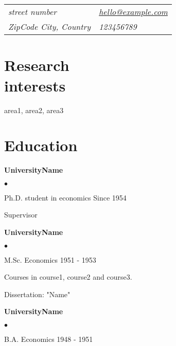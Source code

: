 \documentclass[margin, centered]{res} %
\newenvironment{list2}{
  \begin{list}{$\bullet$}{%
      \setlength{\itemsep}{0in}
      \setlength{\parsep}{0in} \setlength{\parskip}{0in}
      \setlength{\topsep}{0in} \setlength{\partopsep}{0in} 
      \setlength{\leftmargin}{0.2in}}}{\end{list}}
\begin{document}
\vspace*{0.5cm}


\begin{resume}
\section{}	
\vspace{.05in} 
\begin{tabular}{@{}p{2.1in}p{4in}}
\textit{street number} 			& \href{mailto:hello@example.com}{\textit{hello@example.com}}\\           
\textit{ZipCode City, Country}  				& \textit{123456789}\\
\end{tabular}


\section{\sc Research \\ interests} area1, area2, area3


\section{\sc Education}
{\bf UniversityName}\\
\vspace*{-.1in}
\begin{list2}
\item Ph.D. student in economics \hfill {Since 1954} 
\item Supervisor
\end{list2}

{\bf UniversityName}\\
\vspace*{-.1in}
\begin{list2}
\item M.Sc. Economics \hfill {1951 - 1953}
\item Courses in course1, course2 and course3.
\item Dissertation: "Name"
\end{list2}

{\bf UniversityName}\\
\vspace*{-.1in}
\begin{list2}
\item B.A. Economics \hfill {1948 - 1951}
\end{list2}



\end{resume}
\end{document}
